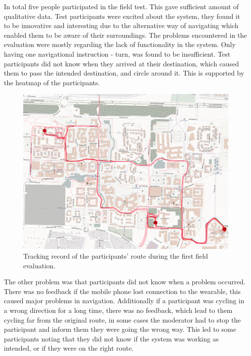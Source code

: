 \documentclass{sigchi}
\begin{document}
\newline
\newline  
In total five people participated in the field test. This gave sufficient amount of qualitative data. Test participants were excited about the system, they found it to be innovative and interesting due to the alternative way of navigating which enabled them to be aware of their surroundings.
The problems encountered in the evaluation were mostly regarding the lack of functionality in the system. Only having one navigational instruction - turn, was found to be insufficient. Test participants did not know when they arrived at their destination, which caused them to pass the intended destination, and circle around it. This is supported by the heatmap of the participants.
\begin{figure}
  \centering
  \includegraphics[width=1.02\columnwidth]{figures/heatmap.jpg}
  \caption{Tracking record of the participants' route during the first field evaluation.}
    \label{fig:heatmap}
\end{figure} 
The other problem was that participants did not know when a problem occurred. There was no feedback if the mobile phone lost connection to the wearable, this caused major problems in navigation. Additionally if a participant was cycling in a wrong direction for a long time, there was no feedback, which lead to them cycling far from the original route, in some cases the moderator had to stop the participant and inform them they were going the wrong way. This led to some participants noting that they did not know if the system was working as intended, or if they were on the right route.
\end{document}
